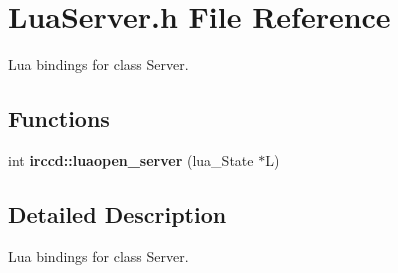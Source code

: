 \hypertarget{a00103}{\section{Lua\-Server.\-h File Reference}
\label{a00103}
}


Lua bindings for class Server.  


\subsection*{Functions}
\begin{DoxyCompactItemize}
\item 
int {\bfseries irccd\-::luaopen\-\_\-server} (lua\-\_\-\-State $\ast$L)
\end{DoxyCompactItemize}


\subsection{Detailed Description}
Lua bindings for class Server. 